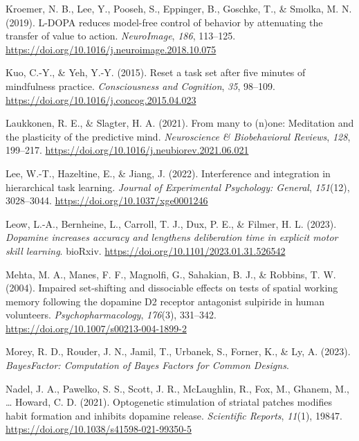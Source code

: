 \documentclass[
  man]{apa6}
\newlength{\cslhangindent}
\newlength{\cslentryspacingunit} %
\newenvironment{CSLReferences}[2] %
 {%
  \setlength{\parindent}{0pt}
  \ifodd #1
  \let\oldpar\par
  \def\par{\hangindent=\cslhangindent\oldpar}
  \fi
  \setlength{\parskip}{#2\cslentryspacingunit}
 }%
 {}
\begin{document}
\begin{CSLReferences}{1}{0}
\leavevmode{}%
Kroemer, N. B., Lee, Y., Pooseh, S., Eppinger, B., Goschke, T., \& Smolka, M. N. (2019). L-{DOPA} reduces model-free control of behavior by attenuating the transfer of value to action. \emph{NeuroImage}, \emph{186}, 113--125. \url{https://doi.org/10.1016/j.neuroimage.2018.10.075}

\leavevmode{}%
Kuo, C.-Y., \& Yeh, Y.-Y. (2015). Reset a task set after five minutes of mindfulness practice. \emph{Consciousness and Cognition}, \emph{35}, 98--109. \url{https://doi.org/10.1016/j.concog.2015.04.023}

\leavevmode{}%
Laukkonen, R. E., \& Slagter, H. A. (2021). From many to (n)one: {Meditation} and the plasticity of the predictive mind. \emph{Neuroscience \& Biobehavioral Reviews}, \emph{128}, 199--217. \url{https://doi.org/10.1016/j.neubiorev.2021.06.021}

\leavevmode{}%
Lee, W.-T., Hazeltine, E., \& Jiang, J. (2022). Interference and integration in hierarchical task learning. \emph{Journal of Experimental Psychology: General}, \emph{151}(12), 3028--3044. \url{https://doi.org/10.1037/xge0001246}

\leavevmode{}%
Leow, L.-A., Bernheine, L., Carroll, T. J., Dux, P. E., \& Filmer, H. L. (2023). \emph{Dopamine increases accuracy and lengthens deliberation time in explicit motor skill learning}. {bioRxiv}. \url{https://doi.org/10.1101/2023.01.31.526542}

\leavevmode{}%
Mehta, M. A., Manes, F. F., Magnolfi, G., Sahakian, B. J., \& Robbins, T. W. (2004). Impaired set-shifting and dissociable effects on tests of spatial working memory following the dopamine {D2} receptor antagonist sulpiride in human volunteers. \emph{Psychopharmacology}, \emph{176}(3), 331--342. \url{https://doi.org/10.1007/s00213-004-1899-2}

\leavevmode{}%
Morey, R. D., Rouder, J. N., Jamil, T., Urbanek, S., Forner, K., \& Ly, A. (2023). \emph{{BayesFactor}: {Computation} of {Bayes Factors} for {Common Designs}}.

\leavevmode{}%
Nadel, J. A., Pawelko, S. S., Scott, J. R., McLaughlin, R., Fox, M., Ghanem, M., \ldots{} Howard, C. D. (2021). Optogenetic stimulation of striatal patches modifies habit formation and inhibits dopamine release. \emph{Scientific Reports}, \emph{11}(1), 19847. \url{https://doi.org/10.1038/s41598-021-99350-5}


\end{CSLReferences}
\end{document}
